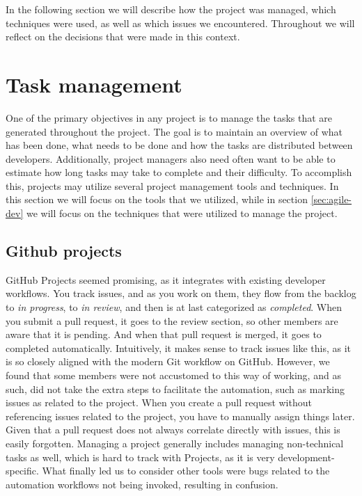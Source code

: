 In the following section we will describe how the project was managed, which techniques were used, as well as which issues we encountered. Throughout we will reflect on the decisions that were made in this context.

\section{Task management}
One of the primary objectives in any project is to manage the tasks that are generated throughout the project. The goal is to maintain an overview of what has been done, what needs to be done and how the tasks are distributed between developers. Additionally, project managers also need often want to be able to estimate how long tasks may take to complete and their difficulty. To accomplish this, projects may utilize several project management tools and techniques. In this section we will focus on the tools that we utilized, while in section \ref{sec:agile-dev} we will focus on the techniques that were utilized to manage the project.

\subsection{Github projects}
GitHub Projects seemed promising, as it integrates with existing developer workflows. You track issues, and as you work on them, they flow from the backlog to \textit{in progress}, to \textit{in review}, and then is at last categorized as \textit{completed}. When you submit a pull request, it goes to the review section, so other members are aware that it is pending. And when that pull request is merged, it goes to completed automatically.
Intuitively, it makes sense to track issues like this, as it is so closely aligned with the modern Git workflow on GitHub. 
However, we found that some members were not accustomed to this way of working, and as such, did not take the extra steps to facilitate the automation, such as marking issues as related to the project.
When you create a pull request without referencing issues related to the project, you have to manually assign things later. Given that a pull request does not always correlate directly with issues, this is easily forgotten.
Managing a project generally includes managing non-technical tasks as well, which is hard to track with Projects, as it is very development-specific.
What finally led us to consider other tools were bugs related to the automation workflows not being invoked, resulting in confusion.

